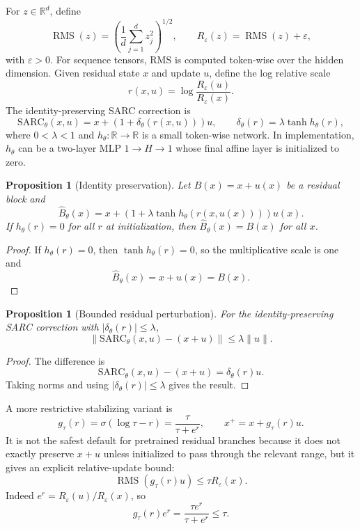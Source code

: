 \documentclass[11pt]{article}
\newtheorem{proposition}[theorem]{Proposition}
\theoremstyle{definition}
\newcommand{\R}{\mathbb{R}}
\newcommand{\RMS}{\operatorname{RMS}}
\begin{document}
For \(z\in\R^d\), define
\[
  \RMS(z)=\left(\frac{1}{d}\sum_{j=1}^d z_j^2\right)^{1/2},
  \qquad
  R_\varepsilon(z)=\RMS(z)+\varepsilon,
\]
with \(\varepsilon>0\). For sequence tensors, RMS is computed token-wise over the hidden dimension. Given residual state \(x\) and update \(u\), define the log relative scale
\[
  r(x,u)=\log\frac{R_\varepsilon(u)}{R_\varepsilon(x)}.
\]
The identity-preserving SARC correction is
\[
  \mathrm{SARC}_\theta(x,u)
  =
  x+\left(1+\delta_\theta(r(x,u))\right)u,
  \qquad
  \delta_\theta(r)=\lambda\tanh h_\theta(r),
\]
where \(0<\lambda<1\) and \(h_\theta:\R\to\R\) is a small token-wise network. In implementation, \(h_\theta\) can be a two-layer MLP \(1\to H\to 1\) whose final affine layer is initialized to zero.

\begin{proposition}[Identity preservation]
Let \(B(x)=x+u(x)\) be a residual block and
\[
  \widehat B_\theta(x)
  =
  x+\left(1+\lambda\tanh h_\theta(r(x,u(x)))\right)u(x).
\]
If \(h_\theta(r)=0\) for all \(r\) at initialization, then \(\widehat B_\theta(x)=B(x)\) for all \(x\).
\end{proposition}

\begin{proof}
If \(h_\theta(r)=0\), then \(\tanh h_\theta(r)=0\), so the multiplicative scale is one and
\[
  \widehat B_\theta(x)=x+u(x)=B(x).
\]
\end{proof}

\begin{proposition}[Bounded residual perturbation]
For the identity-preserving SARC correction with \(|\delta_\theta(r)|\le \lambda\),
\[
  \left\|\mathrm{SARC}_\theta(x,u)-(x+u)\right\|
  \le
  \lambda\|u\|.
\]
\end{proposition}

\begin{proof}
The difference is
\[
  \mathrm{SARC}_\theta(x,u)-(x+u)=\delta_\theta(r)u.
\]
Taking norms and using \(|\delta_\theta(r)|\le \lambda\) gives the result.
\end{proof}

A more restrictive stabilizing variant is
\[
  g_\tau(r)=\sigma(\log\tau-r)=\frac{\tau}{\tau+e^r},
  \qquad
  x^+=x+g_\tau(r)u.
\]
It is not the safest default for pretrained residual branches because it does not exactly preserve \(x+u\) unless initialized to pass through the relevant range, but it gives an explicit relative-update bound:
\[
  \RMS(g_\tau(r)u)\le \tau R_\varepsilon(x).
\]
Indeed \(e^r=R_\varepsilon(u)/R_\varepsilon(x)\), so
\[
  g_\tau(r)e^r=\frac{\tau e^r}{\tau+e^r}\le \tau.
\]
\end{document}
